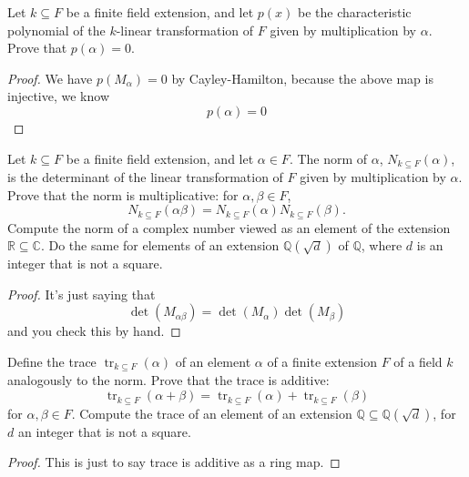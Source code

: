 \documentclass[openany]{book}
\begin{document}
\begin{prob}
Let \( k \subseteq F \) be a finite field extension, and let \( p(x) \) be the characteristic polynomial of the \(k\)-linear transformation of \(F\) given by multiplication by \(\alpha\). Prove that \( p(\alpha) = 0 \).
\end{prob}
\begin{proof}
    We have $p(M_\alpha)=0$ by Cayley-Hamilton, because the above map is injective, we know 
    \begin{equation*}
        p(\alpha)=0
    \end{equation*}
\end{proof}


\begin{prob}
Let \( k \subseteq F \) be a finite field extension, and let \( \alpha \in F \). The norm of \( \alpha \), \( N_{k \subseteq F}(\alpha) \), is the determinant of the linear transformation of \( F \) given by multiplication by \( \alpha \). Prove that the norm is multiplicative: for \( \alpha, \beta \in F \),
\[ N_{k \subseteq F}(\alpha \beta) = N_{k \subseteq F}(\alpha) N_{k \subseteq F}(\beta). \]
Compute the norm of a complex number viewed as an element of the extension \( \mathbb{R} \subseteq \mathbb{C} \). Do the same for elements of an extension \( \mathbb{Q}(\sqrt{d}) \) of \( \mathbb{Q} \), where \( d \) is an integer that is not a square.
\end{prob}
\begin{proof}
    It's just saying that 
    \begin{equation*}
        \det(M_{\alpha\beta})=\det(M_\alpha)\det(M_\beta)
    \end{equation*}
    and you check this by hand.
\end{proof}

\begin{prob}
Define the trace \( \operatorname{tr}_{k \subseteq F}(\alpha) \) of an element \( \alpha \) of a finite extension \( F \) of a field \( k \) analogously to the norm. Prove that the trace is additive:
\[ \operatorname{tr}_{k \subseteq F}(\alpha + \beta) = \operatorname{tr}_{k \subseteq F}(\alpha) + \operatorname{tr}_{k \subseteq F}(\beta) \]
for \( \alpha, \beta \in F \). Compute the trace of an element of an extension \( \mathbb{Q} \subseteq \mathbb{Q}(\sqrt{d}) \), for \( d \) an integer that is not a square.
\end{prob}
\begin{proof}
    This is just to say trace is additive as a ring map.
\end{proof}
\end{document}
